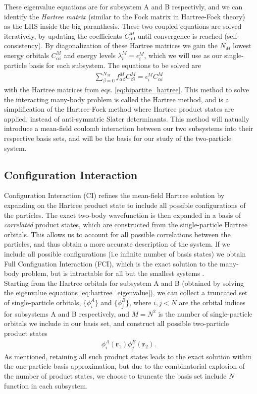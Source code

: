 \documentclass{subfiles}
\begin{document}
These eigenvalue equations are for subsystem A and B respectivly, and we can identify the \emph{Hartree matrix} (similar to the Fock matrix in Hartree-Fock theory) as the LHS inside the big paranthesis. These two coupled equations are solved iteratively, by updating the coefficients $C_{\alpha 0}^M$ until convergence is reached (self-consistency). By diagonalization of these Hartree matrices we gain the $N_M$ lowest energy orbitals $C^M_{\alpha i}$ and energy levels $\lambda^M_i=\epsilon^M_i$\cite{leinonen2024coulomb}, which we will use as our single-particle basis for each subsystem. The equations to be solved are
\begin{align}
    \sum_{\beta=0}^{N_M} f_{\alpha\beta}^M C^M_{\beta i} = \epsilon_i^M C^M_{\alpha i}\label{eq:hartree_eigenvalue}
\end{align}
with the Hartree matrices from eqs. \ref{eq:bipartite_hartree}. This method to solve the interacting many-body problem is called the Hartree method, and is a simplification of the Hartree-Fock method where Hartree product states are applied, instead of anti-symmtric Slater determinants. This method will natually introduce a mean-field coulomb interaction between our two subsystems into their respective basis sets, and will be the basis for our study of the two-particle system.
\subsection{Configuration Interaction}\label{sec:CI}
Configuration Interaction (CI) refines the mean-field Hartree solution by expanding on the Hartree product state to include all possible configurations of the particles. The exact two-body wavefunction is then expanded in a basis of \emph{correlated} product states, which are constructed from the single-particle Hartree orbitals. This allows us to account for all possible correlations between the particles, and thus obtain a more accurate description of the system. If we include all possible configurations (i.e infinite number of basis states) we obtain Full Configuation Interaction (FCI), which is the exact solution to the many-body problem, but is intractable for all but the smallest systems \cite{helgaker2013molecular, szabo1996modern}. \\

Starting from the Hartree orbitals for subsystem A and B (obtained by solving the eigenvalue equations \ref{eq:hartree_eigenvalue}), we can collect a truncated set of single-particle orbitals, $\{\phi^A_i\}$ and $\{\phi^B_j\}$, where $i,j<N$ are the orbital indices for subsystems A and B respectively, and $M=N^2$ is the number of single-particle orbitals we include in our basis set, and construct all possible two-particle product states
\begin{align*}
    \phi_i^A(\mathbf{r}_1)\phi_j^B(\mathbf{r}_2).
\end{align*}  
As mentioned, retaining all such product states leads to the exact solution within the one-particle basis approximation, but due to the combinatorial explosion of the number of product states, we choose to truncate the basis set include $N$ function in each subsystem. 
\end{document}
